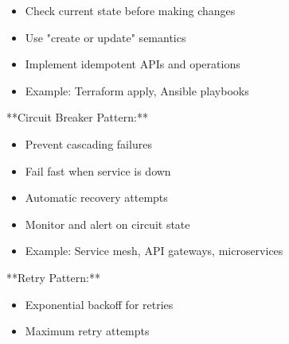 \documentclass[11pt,a4paper]{article}
\begin{document}
\begin{itemize}
\item Check current state before making changes
\end{itemize}

\begin{itemize}
\item Use "create or update" semantics
\end{itemize}

\begin{itemize}
\item Implement idempotent APIs and operations
\end{itemize}

\begin{itemize}
\item Example: Terraform apply, Ansible playbooks
\end{itemize}

**Circuit Breaker Pattern:**

\begin{itemize}
\item Prevent cascading failures
\end{itemize}

\begin{itemize}
\item Fail fast when service is down
\end{itemize}

\begin{itemize}
\item Automatic recovery attempts
\end{itemize}

\begin{itemize}
\item Monitor and alert on circuit state
\end{itemize}

\begin{itemize}
\item Example: Service mesh, API gateways, microservices
\end{itemize}

**Retry Pattern:**

\begin{itemize}
\item Exponential backoff for retries
\end{itemize}

\begin{itemize}
\item Maximum retry attempts
\end{itemize}
\end{document}
